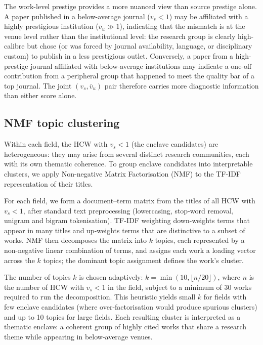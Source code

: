 The work-level prestige provides a more nuanced view than source prestige alone.
A paper published in a below-average journal ($v_s < 1$) may be affiliated with
a highly prestigious institution ($\bar{v}_u \gg 1$), indicating that the
mismatch is at the venue level rather than the institutional level: the research
group is clearly high-calibre but chose (or was forced by journal availability,
language, or disciplinary custom) to publish in a less prestigious outlet.
Conversely, a paper from a high-prestige journal affiliated with below-average
institutions may indicate a one-off contribution from a peripheral group that
happened to meet the quality bar of a top journal.  The joint $(v_s, \bar{v}_u)$
pair therefore carries more diagnostic information than either score alone.

\subsection{NMF topic clustering}

Within each field, the HCW with $v_s < 1$ (the enclave candidates) are
heterogeneous: they may arise from several distinct research communities,
each with its own thematic coherence.  To group enclave candidates into
interpretable clusters, we apply Non-negative Matrix Factorisation (NMF) to
the TF-IDF representation of their titles.

For each field, we form a document--term matrix from the titles of all HCW with
$v_s < 1$, after standard text preprocessing (lowercasing, stop-word removal,
unigram and bigram tokenisation).  TF-IDF weighting down-weights terms that
appear in many titles and up-weights terms that are distinctive to a subset of
works.  NMF then decomposes the matrix into $k$ topics, each represented by a
non-negative linear combination of terms, and assigns each work a loading
vector across the $k$ topics; the dominant topic assignment defines the work's
cluster.

The number of topics $k$ is chosen adaptively: $k = \min(10, \lfloor n /
20\rfloor)$, where $n$ is the number of HCW with $v_s < 1$ in the field,
subject to a minimum of 30 works required to run the decomposition.  This
heuristic yields small $k$ for fields with few enclave candidates (where
over-factorisation would produce spurious clusters) and up to 10 topics for
large fields.  Each resulting cluster is interpreted as a thematic enclave: a
coherent group of highly cited works that share a research theme while
appearing in below-average venues.

